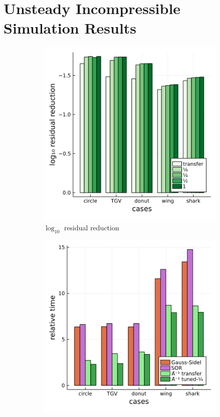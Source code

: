\documentclass[review]{elsarticle}
\begin{document}
\section{Unsteady Incompressible Simulation Results}

\begin{figure}
    \centering
    \begin{subfigure}[b]{0.48\textwidth}
        \centering
        \includegraphics[width=\textwidth]{figures/scaleloss.png}
        \caption{$\log_{10}$ residual reduction}
        \label{fig:scaled loss}
    \end{subfigure}
    \hfill
    \begin{subfigure}[b]{0.48\textwidth}
        \centering
        \includegraphics[width=\textwidth]{figures/crosscount.png}

\end{subfigure}
\end{figure}
\end{document}
